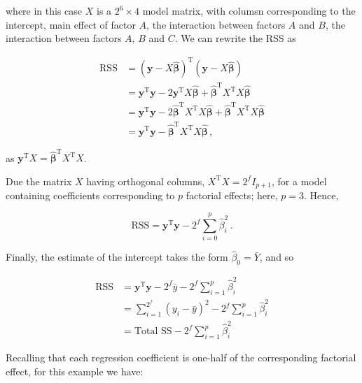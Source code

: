 \documentclass[
]{book}
\theoremstyle{definition}
\theoremstyle{definition}
\theoremstyle{definition}
\theoremstyle{definition}
\theoremstyle{remark}
\begin{document}
where in this case \(X\) is a \(2^6\times 4\) model matrix, with columsn corresponding to the intercept, main effect of factor \(A\), the interaction between factors \(A\) and \(B\), the interaction between factors \(A\), \(B\) and \(C\). We can rewrite the RSS as

\begin{equation*}
\begin{split}
\mbox{RSS} & = (\boldsymbol{y}- X\hat
{\boldsymbol{\beta}})^{\mathrm{T}}(\boldsymbol{y}- X\hat
{\boldsymbol{\beta}}) \\
& = \boldsymbol{y}^{\mathrm{T}}\boldsymbol{y}- 2\boldsymbol{y}^{\mathrm{T}}X\hat
{\boldsymbol{\beta}} + \hat
{\boldsymbol{\beta}}^{\mathrm{T}}X^{\mathrm{T}}X\hat
{\boldsymbol{\beta}} \\
& = \boldsymbol{y}^{\mathrm{T}}\boldsymbol{y}- 2\hat
{\boldsymbol{\beta}}^{\mathrm{T}}X^{\mathrm{T}}X\hat
{\boldsymbol{\beta}} + \hat
{\boldsymbol{\beta}}^{\mathrm{T}}X^{\mathrm{T}}X\hat
{\boldsymbol{\beta}} \\
& = \boldsymbol{y}^{\mathrm{T}}\boldsymbol{y}- \hat
{\boldsymbol{\beta}}^{\mathrm{T}}X^{\mathrm{T}}X\hat
{\boldsymbol{\beta}}\,, 
\end{split}
\end{equation*}

as \(\boldsymbol{y}^{\mathrm{T}}X = \hat{\boldsymbol{\beta}}^{\mathrm{T}}X^{\mathrm{T}}X\).

Due the matrix \(X\) having orthogonal columns, \(X^{\mathrm{T}}X = 2^fI_{p+1}\), for a model containing coefficients corresponding to \(p\) factorial effects; here, \(p=3\). Hence,

\[
\mbox{RSS} = \boldsymbol{y}^{\mathrm{T}}\boldsymbol{y}- 2^f \sum_{i=0}^{p}\hat{\beta}_i^2\,.
\]

Finally, the estimate of the intercept takes the form \(\hat{\beta}_0 = \bar{Y}\), and so

\begin{equation*}
\begin{split}
\mbox{RSS} & = \boldsymbol{y}^{\mathrm{T}}\boldsymbol{y}- 2^f\bar{y} -  2^f\sum_{i=1}^{p}\hat{\beta}_i^2 \\
& = \sum_{i=1}^{2^f}(y_i - \bar{y})^2 - 2^f\sum_{i=1}^{p}\hat{\beta}_i^2 \\
& = \mbox{Total SS} - 2^f\sum_{i=1}^{p}\hat{\beta}_i^2\,
\end{split}
\end{equation*}

Recalling that each regression coefficient is one-half of the corresponding factorial effect, for this example we have:
\end{document}
